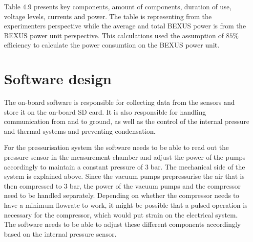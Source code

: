 \documentclass[
  a4paper,
  11pt,
  openany,
  parskip,
  toc=totoc,
  listof=totoc,
  bibliography=totoc
]{scrreprt}
\begin{document}
Table 4.9 presents key components, amount of components, duration of use, voltage levels, currents and power. The table is representing from the experimenters perspective while the average and total BEXUS power is from the BEXUS power unit perspective. This calculations used the assumption of $85\%$ efficiency to calculate the power consumtion on the BEXUS power unit. 
\section{Software design}

The on-board software is responsible for collecting data from the sensors and store it on the on-board SD card. It is also responsible for handling communication from and to ground, as well as the control of the internal pressure and thermal systems and preventing condensation.

For the pressurisation system the software needs to be able to read out the pressure sensor in the measurement chamber and adjust the power of the pumps accordingly to maintain a constant pressure of 3 bar. The mechanical side of the system is explained above. Since the vacuum pumps prepressurise the air that is then compressed to 3 bar, the power of the vacuum pumps and the compressor need to be handled separately. Depending on whether the compressor needs to have a minimum flowrate to work, it might be possible that a pulsed operation is necessary for the compressor, which would put strain on the electrical system. The software needs to be able to adjust these different components accordingly based on the internal pressure sensor. \\
\end{document}

